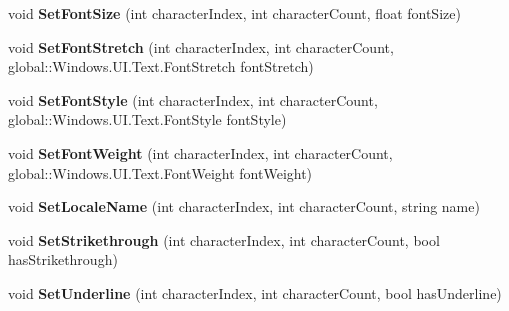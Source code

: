 \begin{DoxyCompactItemize}
void {\bfseries Set\+Font\+Size} (int character\+Index, int character\+Count, float font\+Size)
\item 
\mbox{\label{class_microsoft_1_1_graphics_1_1_canvas_1_1_text_1_1_canvas_text_layout_ad50a824a4bfd07dcc357647441ef7b28}} 
void {\bfseries Set\+Font\+Stretch} (int character\+Index, int character\+Count, global\+::\+Windows.\+U\+I.\+Text.\+Font\+Stretch font\+Stretch)
\item 
\mbox{\label{class_microsoft_1_1_graphics_1_1_canvas_1_1_text_1_1_canvas_text_layout_aa0cb0934c99cab9f6563ad3c1652fe2d}} 
void {\bfseries Set\+Font\+Style} (int character\+Index, int character\+Count, global\+::\+Windows.\+U\+I.\+Text.\+Font\+Style font\+Style)
\item 
\mbox{\label{class_microsoft_1_1_graphics_1_1_canvas_1_1_text_1_1_canvas_text_layout_a6afdb440ee71967887652cfeb495a190}} 
void {\bfseries Set\+Font\+Weight} (int character\+Index, int character\+Count, global\+::\+Windows.\+U\+I.\+Text.\+Font\+Weight font\+Weight)
\item 
\mbox{\label{class_microsoft_1_1_graphics_1_1_canvas_1_1_text_1_1_canvas_text_layout_afb6740be2f241b804cd331371d94e024}} 
void {\bfseries Set\+Locale\+Name} (int character\+Index, int character\+Count, string name)
\item 
\mbox{\label{class_microsoft_1_1_graphics_1_1_canvas_1_1_text_1_1_canvas_text_layout_adb3d9f62cfff14e9deb741c9b961e3a0}} 
void {\bfseries Set\+Strikethrough} (int character\+Index, int character\+Count, bool has\+Strikethrough)
\item 
\mbox{\label{class_microsoft_1_1_graphics_1_1_canvas_1_1_text_1_1_canvas_text_layout_a5c9ca1a5dab01179d0a389e3298b1f09}} 
void {\bfseries Set\+Underline} (int character\+Index, int character\+Count, bool has\+Underline)
\item 
\mbox{\label{class_microsoft_1_1_graphics_1_1_canvas_1_1_text_1_1_canvas_text_layout_a4d0d027830a031c0d15c1e89b0f84142}} 

\end{DoxyCompactItemize}
